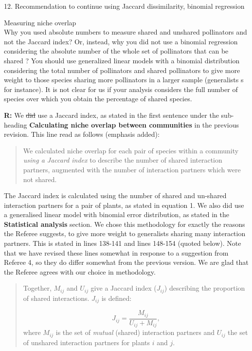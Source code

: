 \documentclass[12pt]{letter}
\newenvironment{refquote}{\bigskip \begin{it}}{\end{it}\smallskip}
\providecommand{\DIFadd}[1]{{\protect\color{blue}\uwave{#1}}} %
\providecommand{\DIFdel}[1]{{\protect\color{red}\sout{#1}}}                      %
\providecommand{\DIFaddbegin}{} %
\providecommand{\DIFaddend}{} %
\providecommand{\DIFdelbegin}{} %
\providecommand{\DIFdelend}{} %
\newcommand{\DIFscaledelfig}{0.5}
\newlength{\DIFdelgraphicswidth} %
\newlength{\DIFdelgraphicsheight} %
\newcommand{\DIFaddincludegraphics}[2][]{{\color{blue}\fbox{\DIFOincludegraphics[#1]{#2}}}} %
\newcommand{\DIFdelincludegraphics}[2][]{%
\sbox{\DIFdelgraphicsbox}{\DIFOincludegraphics[#1]{#2}}%
\settoboxwidth{\DIFdelgraphicswidth}{\DIFdelgraphicsbox} %
\settoboxtotalheight{\DIFdelgraphicsheight}{\DIFdelgraphicsbox} %
\scalebox{\DIFscaledelfig}{%
\parbox[b]{\DIFdelgraphicswidth}{\usebox{\DIFdelgraphicsbox}\\[-\baselineskip] \rule{\DIFdelgraphicswidth}{0em}}\llap{\resizebox{\DIFdelgraphicswidth}{\DIFdelgraphicsheight}{%
\setlength{\unitlength}{\DIFdelgraphicswidth}%
\begin{picture}(1,1)%
\thicklines\linethickness{2pt} %
{\color[rgb]{1,0,0}\put(0,0){\framebox(1,1){}}}%
{\color[rgb]{1,0,0}\put(0,0){\line( 1,1){1}}}%
{\color[rgb]{1,0,0}\put(0,1){\line(1,-1){1}}}%
\end{picture}%
}\hspace*{3pt}}} %
} %
\DeclareRobustCommand{\DIFaddbegin}{\DIFOaddbegin \let\includegraphics\DIFaddincludegraphics} %
\DeclareRobustCommand{\DIFaddend}{\DIFOaddend \let\includegraphics\DIFOincludegraphics} %
\DeclareRobustCommand{\DIFdelbegin}{\DIFOdelbegin \let\includegraphics\DIFdelincludegraphics} %
\DeclareRobustCommand{\DIFdelend}{\DIFOaddend \let\includegraphics\DIFOincludegraphics} %
\begin{document}
	12. Recommendation to continue using Jaccard dissimilarity, binomial regression

		\begin{refquote}
			Measuring niche overlap\\
			Why you used absolute numbers to measure shared and unshared pollinators and not the Jaccard index? Or, instead, why you did not use a binomial regression considering the absolute number of the whole set of pollinators that can be shared ? You should use generalized linear models with a binomial distribution considering the total number of pollinators and shared pollinators to give more weight to those species sharing more pollinators in a larger sample (generalists s for instance). It is not clear for us if your analysis considers the full number of species over which you obtain the percentage of shared species.
		\end{refquote}

		\textbf{R:} We \DIFdelbegin \DIFdel{did }\DIFdelend \DIFaddbegin \DIFadd{apologize for any confusion here, as we did in fact }\DIFaddend use a Jaccard index, as stated in the first  sentence under the sub-heading \textbf{Calculating niche overlap between communities} in the previous revision. This line read as follows (emphasis added): 
		\begin{quotation}
		We calculated niche overlap for each pair of species within a community \emph{using a Jaccard index} to describe the number of shared interaction partners, augmented with the number of interaction partners which were not shared.
		\end{quotation}

		The Jaccard index is calculated using the number of shared and un-shared interaction partners for a pair of plants, as stated in equation 1. We also did use a generalised linear model with binomial error distribution, as stated in the \textbf{Statistical analysis} section. We chose this methodology for exactly the reasons the Referee suggests, to give more weight to generalists sharing many interaction partners. This is stated in lines 138-141 and lines 148-154 (quoted below). Note that we have revised these lines somewhat in response to a suggestion from Referee 4, so they do differ somewhat from the previous version. We are glad that the Referee agrees with our choice in methodology.

		\begin{quotation}

			Together, $M_{ij}$ and $U_{ij}$ give a Jaccard index ($J_{ij}$) describing 
			the proportion of shared interactions. $J_{ij}$ is defined: 

			\begin{equation}
			J_{ij} = \frac{M_{ij}}{U_{ij}+M_{ij}} ,
			\end{equation}
			where $M_{ij}$ is the set of \emph{mutual} (shared) interaction partners and $U_{ij}$ the set of unshared interaction partners for plants $i$ and $j$.

		\end{quotation}
\end{document}
